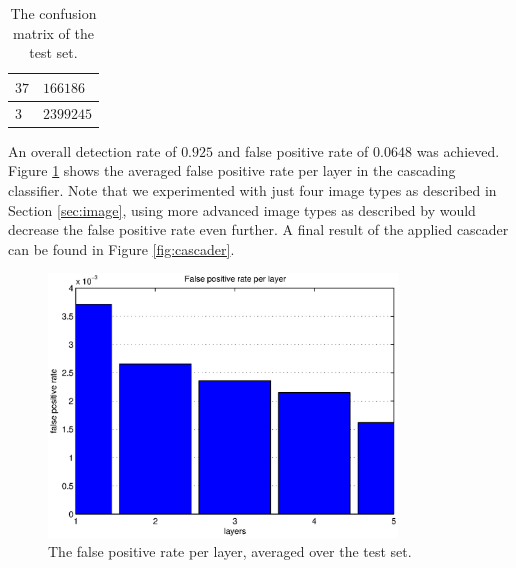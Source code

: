 \documentclass[a4paper,11pt]{article}
\begin{document}
\begin{table}[!ht]
\centering
\begin{tabular}{|l|l|}
\hline
$37$ & $166186$ \\
\hline
$3$  & $2399245$ \\
\hline
\end{tabular}
\caption{The confusion matrix of the test set.}
\label{tab:conf}
\end{table}
An overall detection rate of $0.925$ and false positive rate of $0.0648$ was
achieved. Figure \ref{fig:fprate} shows the averaged false positive rate per
layer in the cascading classifier. Note that we experimented with just four
image types as described in Section \ref{sec:image}, using more advanced image
types as described by \cite{naturaltext} would decrease the false positive rate
even further. A final result of the applied cascader can be found in Figure
\ref{fig:cascader}.
\begin{figure}[!ht]
\centering
\includegraphics[height=7cm]{img/fprate}
\caption{The false positive rate per layer, averaged over the test set.}
\label{fig:fprate}
\end{figure}
\end{document}
